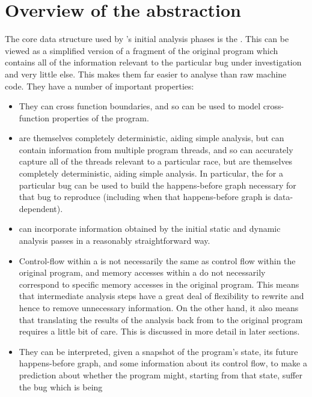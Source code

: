 \section{Overview of the {\StateMachine} abstraction}

The core data structure used by {\technique}'s initial analysis phases
is the {\StateMachine}.  This can be viewed as a simplified version of
a fragment of the original program which contains all of the
information relevant to the particular bug under investigation and
very little else.  This makes them far easier to analyse than raw
machine code.  They have a number of important properties:

\begin{itemize}
\item
  They can cross function boundaries, and so can be used to model
  cross-function properties of the program.
\item
  {\STateMachines} are themselves completely deterministic, aiding
  simple analysis, but can contain information from multiple program
  threads, and so can accurately capture all of the threads relevant
  to a particular race, but are themselves completely deterministic,
  aiding simple analysis.  In particular, the {\StateMachine} for a
  particular bug can be used to build the happens-before graph
  necessary for that bug to reproduce (including when that
  happens-before graph is data-dependent).
\item
  {\STateMachines} can incorporate information obtained by the initial
  static and dynamic analysis passes in a reasonably straightforward
  way.
\item
  Control-flow within a {\StateMachine} is not necessarily the same as
  control flow within the original program, and memory accesses within
  a {\StateMachine} do not necessarily correspond to specific memory
  accesses in the original program.  This means that intermediate
  analysis steps have a great deal of flexibility to rewrite
  {\StateMachines} and hence to remove unnecessary information.  On
  the other hand, it also means that translating the results of the
  analysis back from {\StateMachines} to the original program requires
  a little bit of care.  This is discussed in more detail in later
  sections.
\item
  They can be interpreted, given a snapshot of the program's state,
  its future happens-before graph, and some information about its
  control flow, to make a prediction about whether the program might,
  starting from that state, suffer the bug which is being

\end{itemize}
